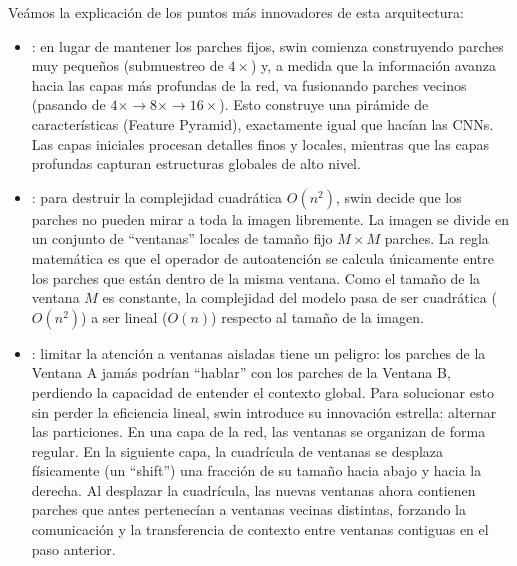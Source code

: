 \noindent
Veámos la explicación de los puntos más innovadores de esta arquitectura:
\begin{itemize}
    \item {}: en lugar de mantener los parches fijos, swin comienza construyendo parches muy pequeños (submuestreo de $4\times$) y, a medida que la información avanza hacia las capas más profundas de la red, va fusionando parches vecinos (pasando de $4\times \rightarrow 8\times \rightarrow 16\times$). Esto construye una pirámide de características (Feature Pyramid), exactamente igual que hacían las CNNs. Las capas iniciales procesan detalles finos y locales, mientras que las capas profundas capturan estructuras globales de alto nivel. 
    \item {}: para destruir la complejidad cuadrática $O(n^2)$, swin decide que los parches no pueden mirar a toda la imagen libremente. La imagen se divide en un conjunto de ``ventanas'' locales de tamaño fijo $M \times M$ parches. La regla matemática es que el operador de autoatención se calcula únicamente entre los parches que están dentro de la misma ventana. Como el tamaño de la ventana $M$ es constante, la complejidad del modelo pasa de ser cuadrática ($O(n^2)$) a ser lineal ($O(n)$) respecto al tamaño de la imagen. 
    \item {}: limitar la atención a ventanas aisladas tiene un peligro: los parches de la Ventana A jamás podrían ``hablar'' con los parches de la Ventana B, perdiendo la capacidad de entender el contexto global. Para solucionar esto sin perder la eficiencia lineal, swin introduce su innovación estrella: alternar las particiones. En una capa de la red, las ventanas se organizan de forma regular. En la siguiente capa, la cuadrícula de ventanas se desplaza físicamente (un ``shift'') una fracción de su tamaño hacia abajo y hacia la derecha. Al desplazar la cuadrícula, las nuevas ventanas ahora contienen parches que antes pertenecían a ventanas vecinas distintas, forzando la comunicación y la transferencia de contexto entre ventanas contiguas en el paso anterior.
\end{itemize}



